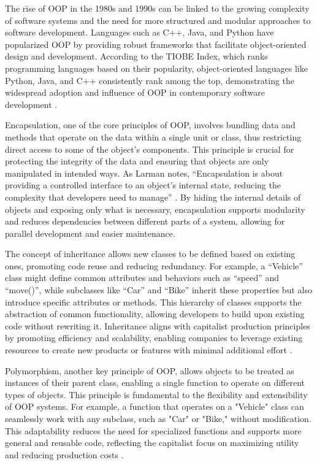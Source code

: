 \begin{refsection}
The rise of OOP in the 1980s and 1990s can be linked to the growing complexity of software systems and the need for more structured and modular approaches to software development. Languages such as C++, Java, and Python have popularized OOP by providing robust frameworks that facilitate object-oriented design and development. According to the TIOBE Index, which ranks programming languages based on their popularity, object-oriented languages like Python, Java, and C++ consistently rank among the top, demonstrating the widespread adoption and influence of OOP in contemporary software development \cite[pp.~110-115]{Pressman2019}.

Encapsulation, one of the core principles of OOP, involves bundling data and methods that operate on the data within a single unit or class, thus restricting direct access to some of the object's components. This principle is crucial for protecting the integrity of the data and ensuring that objects are only manipulated in intended ways. As Larman notes, “Encapsulation is about providing a controlled interface to an object's internal state, reducing the complexity that developers need to manage” \cite[pp.~120-122]{Larman2008}. By hiding the internal details of objects and exposing only what is necessary, encapsulation supports modularity and reduces dependencies between different parts of a system, allowing for parallel development and easier maintenance.

The concept of inheritance allows new classes to be defined based on existing ones, promoting code reuse and reducing redundancy. For example, a “Vehicle” class might define common attributes and behaviors such as “speed” and “move()”, while subclasses like “Car” and “Bike” inherit these properties but also introduce specific attributes or methods. This hierarchy of classes supports the abstraction of common functionality, allowing developers to build upon existing code without rewriting it. Inheritance aligns with capitalist production principles by promoting efficiency and scalability, enabling companies to leverage existing resources to create new products or features with minimal additional effort \cite[pp.~65-68]{Pfleeger2010}.

Polymorphism, another key principle of OOP, allows objects to be treated as instances of their parent class, enabling a single function to operate on different types of objects. This principle is fundamental to the flexibility and extensibility of OOP systems. For example, a function that operates on a "Vehicle" class can seamlessly work with any subclass, such as "Car" or "Bike," without modification. This adaptability reduces the need for specialized functions and supports more general and reusable code, reflecting the capitalist focus on maximizing utility and reducing production costs \cite[pp.~78-81]{Pressman2019}.


\end{refsection}
